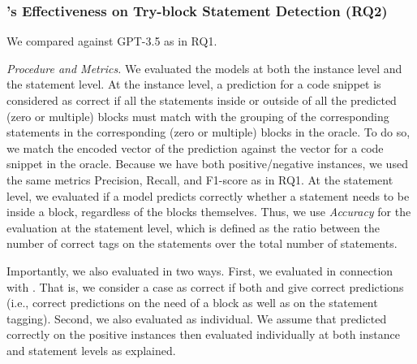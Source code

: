\subsubsection{{\xstate}'s Effectiveness on Try-block Statement Detection (RQ2)}

 We compared {\xstate} against GPT-3.5 as in RQ1.




{\em Procedure and Metrics.} We evaluated the models at both the
instance level and the statement level. At the instance level, a
prediction for a code snippet is considered as correct if all the
statements inside or outside of all the predicted (zero or
multiple)  blocks must match with the grouping of the
corresponding statements in the corresponding (zero or
multiple)  blocks in the oracle. To do so, we match the
encoded vector  of the prediction against the
vector for a code snippet in the oracle. Because we have both
positive/negative instances, we used the same metrics Precision,
Recall, and F1-score as in RQ1. At the statement level, we evaluated
if a model predicts correctly whether a statement needs to be inside
a  block, regardless of the blocks themselves. Thus, we use
{\em Accuracy} for the evaluation at the statement level, which is
defined as the ratio between the number of correct tags on the
statements over the total number of statements.

Importantly, we also evaluated {\tool} in two ways. First, we
evaluated {\xstate} in connection with {\xblock}. That is, we consider
a case as correct if both {\xblock} and {\xstate} give correct
predictions (i.e., correct predictions on the need of
a  block as well as on the statement tagging). Second,
we also evaluated {\xstate} as individual. We assume that {\xblock}
predicted correctly on the positive instances then evaluated {\xstate}
individually at both instance and statement levels as explained.

